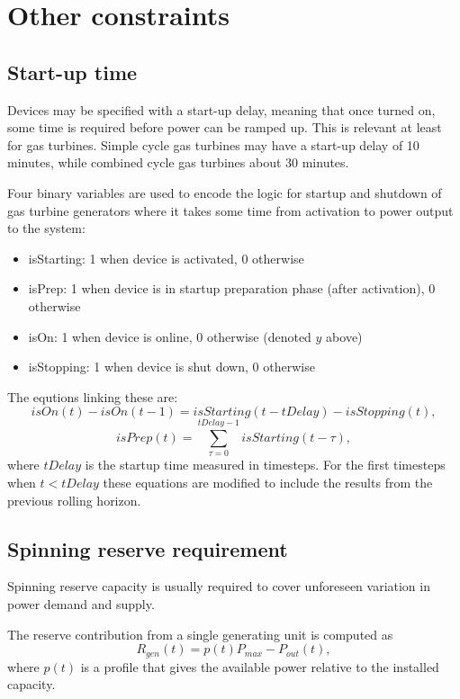 \documentclass[12pt]{article}
\begin{document}
\section{Other constraints}

 
 
\subsection{Start-up time}

Devices may be specified with a start-up delay, meaning that once turned on, some time is required before power can be ramped up. This is relevant at least for gas turbines. 
Simple cycle gas turbines may have a start-up delay of 10 minutes, while combined cycle gas turbines about 30 minutes.

Four binary variables are used to encode the logic for startup and shutdown of gas turbine generators where it takes some time from activation to power output to the system: 
\begin{itemize}
\item isStarting: 1 when device is activated, 0 otherwise
\item isPrep: 1 when device is in startup preparation phase (after activation), 0 otherwise
\item isOn: 1 when device is online, 0 otherwise (denoted $y$ above)
\item isStopping: 1 when device is shut down, 0 otherwise
\end{itemize}

\medskip\noindent
The equtions linking these are:
\begin{equation}
	isOn(t) - isOn(t-1) = isStarting(t-tDelay) - isStopping(t),
\end{equation}
\begin{equation}
	isPrep(t)  = \sum_{\tau=0}^{tDelay-1} isStarting(t-\tau),
\end{equation}
where $tDelay$ is the startup time measured in timesteps.
For the first timesteps when $t<tDelay$ these equations are modified to include the results from the previous rolling horizon.


\subsection{Spinning reserve requirement}
Spinning reserve capacity is usually required to cover unforeseen variation in power demand and supply.

The reserve contribution from a single generating unit is computed as 
\begin{equation}
	R_{gen}(t) = p(t) P_{max} - P_{out}(t),
\end{equation}
where $p(t)$ is a profile that gives the available power relative to the installed capacity.
\end{document}
